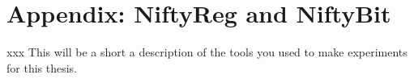 
\appendix
%

\chapter{Appendix: NiftyReg and NiftyBit}
\label{appendixlabel3}
xxx  This will be a short a description of the tools you used to make experiments for this thesis.